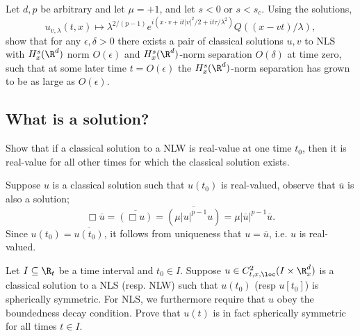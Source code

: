 \begin{solution}

\end{solution}

\begin{statement}
	Let $d, p$ be arbitrary and let $\mu = +1$, and let $s < 0$ or $s < s_c$. Using the solutions,
		\[ u_{v, \lambda} (t, x) \mapsto \lambda^{2/(p - 1)} e^{i (x \cdot v + i t |v|^2 /2 + i t \tau/\lambda^2)} Q((x - vt)/\lambda),\]
	show that for any $\epsilon, \delta > 0$ there exists a pair of classical solutions $u, v$ to NLS with $H^s_x (\R^d)$ norm $O(\epsilon)$ and $H^s_x (\R^d)$-norm separation $O(\delta)$ at time zero, such that at some later time $t = O(\epsilon)$ the $H^s_x (\R^d)$-norm separation has grown to be as large as $O(\epsilon)$. 	
		
\end{statement}

\begin{solution}

\end{solution}
\subsection{What is a solution?}
\begin{statement}
	Show that if a classical solution to a NLW is real-value at one time $t_0$, then it is real-value for all other times for which the classical solution exists. 
\end{statement}

\begin{solution}
	Suppose $u$ is a classical solution such that $u(t_0)$ is real-valued, observe that $\overline u$ is also a solution;
		\[ \Box \overline u = \overline{(\Box u)} = \overline{(\mu |u|^{p - 1} u)} = \mu |\overline u|^{p - 1} \overline u. \]
	Since $u(t_0) = \overline{u(t_0)}$, it follows from uniqueness that $u = \overline u$, i.e. $u$ is real-valued.	
\end{solution}

\begin{statement}
	Let $I \subseteq \R_t$ be a time interval and $t_0 \in I$. Suppose $u \in C^2_{t, x, \loc} (I \times \R^d_x)$ is a classical solution to a NLS (resp. NLW) such that $u(t_0)$ (resp $u[t_0]$) is spherically symmetric. For NLS, we furthermore require that $u$ obey the boundedness decay condition. Prove that $u(t)$ is in fact spherically symmetric for all times $t \in I$. 
\end{statement}

